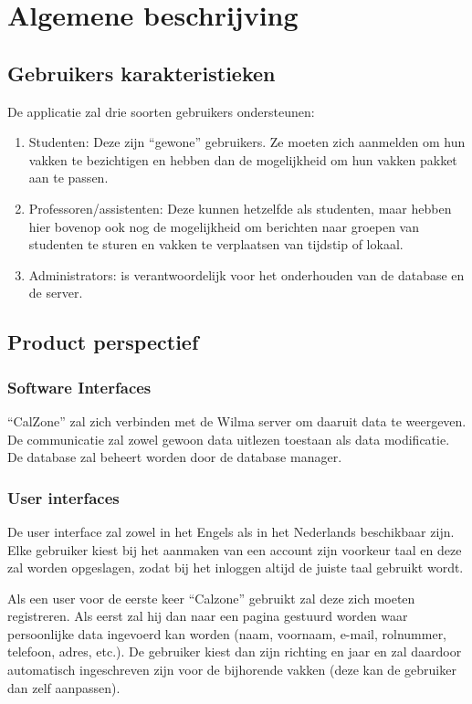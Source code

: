 \chapter{Algemene beschrijving}

\section{Gebruikers karakteristieken}
De applicatie zal drie soorten gebruikers ondersteunen:

\begin{enumerate} 
    \item Studenten: Deze zijn “gewone” gebruikers. 
    Ze moeten zich aanmelden om hun vakken te bezichtigen en hebben dan de mogelijkheid om hun vakken pakket aan te passen.
    \item Professoren/assistenten: Deze kunnen hetzelfde als studenten, maar hebben hier bovenop ook nog de mogelijkheid om berichten naar     groepen van studenten te sturen en vakken te verplaatsen van tijdstip of lokaal.
    \item Administrators: is verantwoordelijk voor het onderhouden van de database en de server.
\end{enumerate}

\section{Product perspectief}

\subsection{Software Interfaces}
“CalZone” zal zich verbinden met de Wilma server om daaruit data te weergeven. 
De communicatie zal zowel gewoon data uitlezen toestaan als data modificatie.
De database zal beheert worden door de database manager.

\subsection{User interfaces}
De user interface zal zowel in het Engels als in het Nederlands beschikbaar zijn. 
Elke gebruiker kiest bij het aanmaken van een account zijn voorkeur taal en deze zal worden opgeslagen, zodat bij het inloggen altijd de juiste taal gebruikt wordt.

Als een user voor de eerste keer “Calzone” gebruikt zal deze zich moeten registreren. 
Als eerst zal hij dan naar een pagina gestuurd worden waar persoonlijke data ingevoerd kan worden (naam, voornaam, e-mail, rolnummer, telefoon, adres, etc.). 
De gebruiker kiest dan zijn richting en jaar en zal daardoor automatisch ingeschreven zijn voor de bijhorende vakken (deze kan de gebruiker dan zelf aanpassen). 

